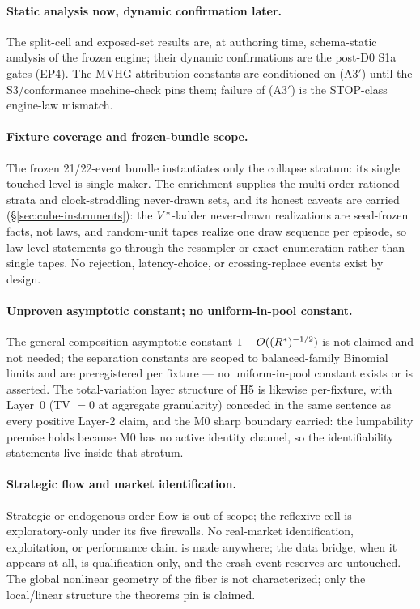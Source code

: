 \paragraph{Static analysis now, dynamic confirmation later.}
The split-cell and exposed-set results are, at authoring time,
schema-static analysis of the frozen engine; their dynamic confirmations are
the post-D0 S1a gates (EP4). The MVHG attribution constants are conditioned
on (A3$'$) until the S3/conformance machine-check pins them; failure of
(A3$'$) is the STOP-class engine-law mismatch.

\paragraph{Fixture coverage and frozen-bundle scope.}
The frozen 21/22-event bundle instantiates only the collapse stratum: its
single touched level is single-maker. The enrichment supplies the multi-order
rationed strata and clock-straddling never-drawn sets, and its honest
caveats are carried (\S\ref{sec:cube-instruments}): the $V^{*}$-ladder
never-drawn realizations are seed-frozen facts, not laws, and random-unit
tapes realize one draw sequence per episode, so law-level statements go
through the resampler or exact enumeration rather than single tapes. No
rejection, latency-choice, or crossing-replace events exist by design.

\paragraph{Unproven asymptotic constant; no uniform-in-pool constant.}
The general-composition asymptotic constant $1 -
O((R^{*})^{-1/2})$ is not claimed and not needed; the separation constants
are scoped to balanced-family Binomial limits and are preregistered per
fixture --- no uniform-in-pool constant exists or is asserted. The
total-variation layer structure of H5 is likewise per-fixture, with Layer~0
(TV $=0$ at aggregate granularity) conceded in the same sentence as every
positive Layer-2 claim, and the M0 sharp boundary carried: the lumpability
premise holds because M0 has no active identity channel, so the
identifiability statements live inside that stratum.

\paragraph{Strategic flow and market identification.}
Strategic or endogenous order flow is out of scope; the reflexive cell is
exploratory-only under its five firewalls. No real-market identification,
exploitation, or performance claim is made anywhere; the data bridge, when it
appears at all, is qualification-only, and the crash-event reserves are
untouched. The global nonlinear geometry of the fiber is not characterized;
only the local/linear structure the theorems pin is claimed.

